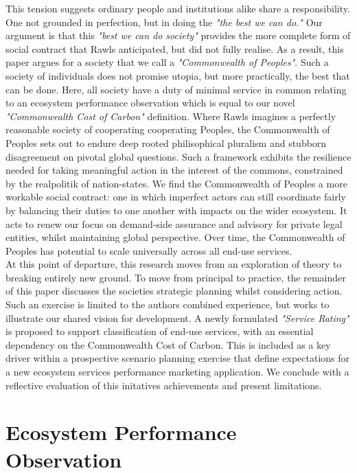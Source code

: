 \documentclass[12pt, oneside]{article}   	%
\begin{document}
This tension suggests ordinary people and institutions alike share a responsibility.
One not grounded in perfection, but in doing the \emph{"the best we can do."}
Our argument is that this \emph{"best we can do society"} provides the more complete form of social contract that Rawls anticipated, but did not fully realise.
As a result, this paper argues for a society that we call a \emph{"Commonwealth of Peoples"}.
Such a society of individuals does not promise utopia, but more practically, the best that can be done.
Here, all society have a duty of minimal service in common relating to an ecosystem performance observation which is equal to our novel \emph{"Commonwealth Cost of Carbon"} definition.
Where Rawls imagines a perfectly reasonable society of cooperating cooperating Peoples, the Commonwealth of Peoples sets out to endure deep rooted philisophical pluralism and stubborn disagreement on pivotal global questions.
Such a framework exhibits the resilience needed for taking meaningful action in the interest of the commons, constrained by the realpolitik of nation-states.
We find the Commonwealth of Peoples a more workable social contract: one in which imperfect actors can still coordinate fairly by balancing their duties to one another with impacts on the wider ecosystem.
It acts to renew our focus on demand-side assurance and advisory for private legal entities, whilst maintaining global perspective.
Over time, the Commonwealth of Peoples has potential to scale universally across all end-use services.\\

At this point of departure, this research moves from an exploration of theory to breaking entirely new ground.
To move from principal to practice, the remainder of this paper discusses the societies strategic planning whilst considering action.
Such an exercise is limited to the authors combined experience, but works to illustrate our shared vision for development.
A newly formulated \emph{"Service Rating"} is proposed to support classification of end-use services, with an essential dependency on the Commonwealth Cost of Carbon.
This is included as a key driver within a prospective scenario planning exercise that define expectations for a new ecosystem services performance marketing application.
We conclude with a reflective evaluation of this initatives achievements and present limitations.\\


\section{Ecosystem Performance Observation}
\end{document}
